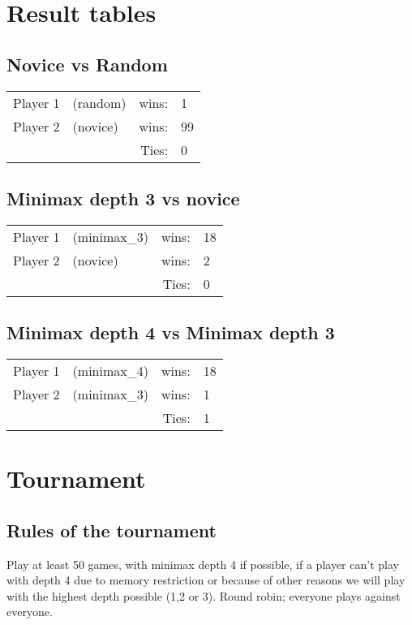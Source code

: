 \documentclass[12pt, a4paper]{article}
\begin{document}
\section{Result tables}

\subsection{Novice vs Random}
  \begin{tabular}{| l  l  r l |}
    \hline
 	Player 1 & (random) & wins: & 1 \\
 	Player 2 & (novice) & wins: & 99 \\
 	& &  Ties: & 0 \\
    \hline
  \end{tabular}



\subsection{Minimax depth 3 vs novice}
  \begin{tabular}{| l  l  r l |}
    \hline
 	Player 1 & (minimax\_3) & wins: & 18 \\
 	Player 2 & (novice) & wins: & 2 \\
 	& &  Ties: & 0 \\
    \hline
  \end{tabular}


\subsection{Minimax depth 4 vs Minimax depth 3}
  \begin{tabular}{| l  l  r l |}
    \hline
 	Player 1 & (minimax\_4) & wins: & 18 \\
 	Player 2 & (minimax\_3) & wins: & 1 \\
 	& &  Ties: & 1 \\
    \hline
  \end{tabular}

\section{Tournament}

\subsection{Rules of the tournament}
Play at least 50 games, with minimax depth 4 if possible, if a player can't play with depth 4 due to memory restriction or because of other reasons we will play with the highest depth possible (1,2 or 3). Round robin; everyone plays against everyone. 
\end{document}
